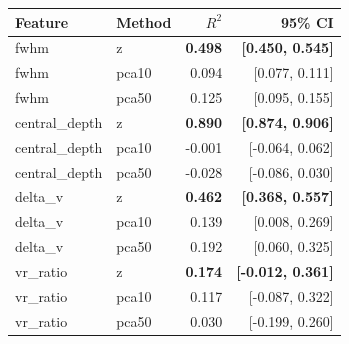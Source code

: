 \begin{tabular}{llrr}
  \toprule
  Feature & Method & $R^2$ & 95\% CI \\
  \midrule
  fwhm                 & z     & \textbf{0.498} & \textbf{[0.450, 0.545]} \\
  fwhm                 & pca10 & 0.094 & [0.077, 0.111] \\
  fwhm                 & pca50 & 0.125 & [0.095, 0.155] \\
  \midrule
  central\_depth       & z     & \textbf{0.890} & \textbf{[0.874, 0.906]} \\
  central\_depth       & pca10 & -0.001 & [-0.064, 0.062] \\
  central\_depth       & pca50 & -0.028 & [-0.086, 0.030] \\
  \midrule
  delta\_v             & z     & \textbf{0.462} & \textbf{[0.368, 0.557]} \\
  delta\_v             & pca10 & 0.139 & [0.008, 0.269] \\
  delta\_v             & pca50 & 0.192 & [0.060, 0.325] \\
  \midrule
  vr\_ratio            & z     & \textbf{0.174} & \textbf{[-0.012, 0.361]} \\
  vr\_ratio            & pca10 & 0.117 & [-0.087, 0.322] \\
  vr\_ratio            & pca50 & 0.030 & [-0.199, 0.260] \\

  \bottomrule
\end{tabular}
